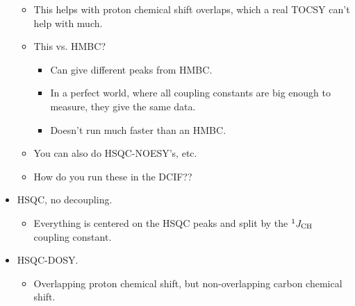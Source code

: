\documentclass[../notes.tex]{subfiles}
\begin{document}
\begin{itemize}
\begin{itemize}
        \item This helps with proton chemical shift overlaps, which a real TOCSY can't help with much.
        \item This vs. HMBC?
        \begin{itemize}
            \item Can give different peaks from HMBC.
            \item In a perfect world, where all coupling constants are big enough to measure, they give the same data.
            \item Doesn't run much faster than an HMBC.
        \end{itemize}
        \item You can also do HSQC-NOESY's, etc.
        \item How do you run these in the DCIF??
    \end{itemize}
    \item HSQC, no decoupling.
    \begin{itemize}
        \item Everything is centered on the HSQC peaks and split by the ${}^1J_{\ce{CH}}$ coupling constant.
    \end{itemize}
    \item HSQC-DOSY.
    \begin{itemize}
        \item Overlapping proton chemical shift, but non-overlapping carbon chemical shift.
    \end{itemize}
\end{itemize}
\end{document}
